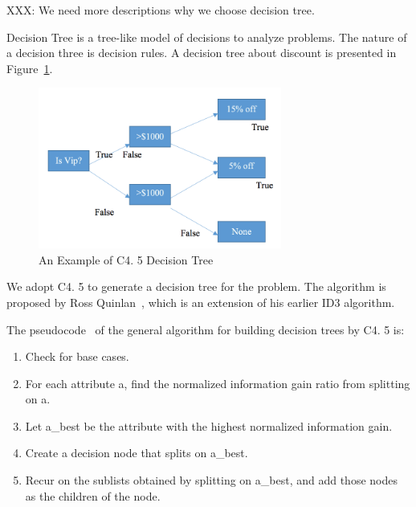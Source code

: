 XXX: We need more descriptions why we choose decision tree.


Decision Tree is a tree-like model of decisions to analyze problems.
 The nature of a decision three is decision rules.
 A decision tree about discount is presented in Figure~\ref{fig:ctree}.


\begin{figure}[!htbp]
\centering
\includegraphics[width=8.0cm]{ctree.png} 
\newline
\caption{An Example of C4.
5 Decision Tree}
\label{fig:ctree} 
\end{figure}

We adopt C4.
5 to generate a decision tree for the problem.
 The algorithm is proposed by Ross Quinlan~\cite{quinlan}, which is an extension of his earlier ID3 algorithm.

The pseudocode~\cite{Kotsiantis} of the general algorithm for building decision trees by C4.
5 is: 

\begin{enumerate}
\item Check for base cases.

\item For each attribute a, find the normalized information gain ratio from splitting on a.

\item Let a\_best be the attribute with the highest normalized information gain.

\item Create a decision node that splits on a\_best.

\item Recur on the sublists obtained by splitting on a\_best, and add those nodes as the children of the node.

\end{enumerate}


